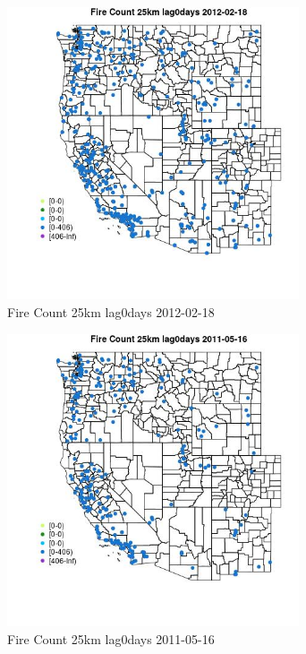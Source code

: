 \begin{figure} 
\centering  
\includegraphics[width=0.77\textwidth]{Code_Outputs/Report_ML_input_PM25_Step4_part_f_de_duplicated_aveswNAs_MapObsFire_Count_25km_lag0days2012-02-18.jpg} 
\caption{\label{fig:Report_ML_input_PM25_Step4_part_f_de_duplicated_aveswNAsMapObsFire_Count_25km_lag0days2012-02-18}Fire Count 25km lag0days 2012-02-18} 
\end{figure} 
 

\clearpage 

\begin{figure} 
\centering  
\includegraphics[width=0.77\textwidth]{Code_Outputs/Report_ML_input_PM25_Step4_part_f_de_duplicated_aveswNAs_MapObsFire_Count_25km_lag0days2011-05-16.jpg} 
\caption{\label{fig:Report_ML_input_PM25_Step4_part_f_de_duplicated_aveswNAsMapObsFire_Count_25km_lag0days2011-05-16}Fire Count 25km lag0days 2011-05-16} 
\end{figure} 
 

